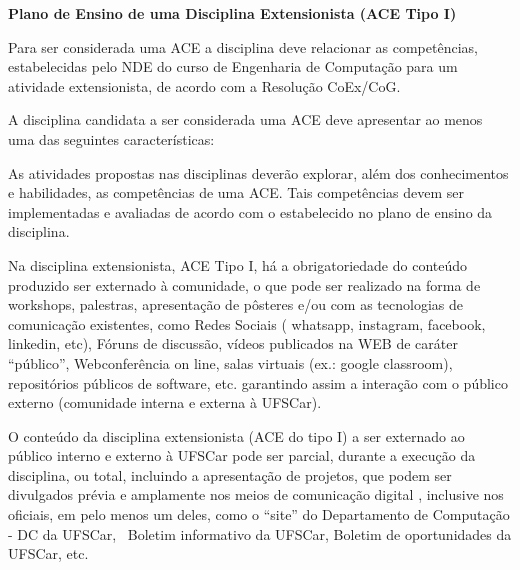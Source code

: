 \bigskip

\textbf{Plano de Ensino de uma Disciplina Extensionista (ACE Tipo I)}


\bigskip

Para ser considerada uma ACE a disciplina deve relacionar as competências, estabelecidas pelo NDE do curso de Engenharia
de Computação para um atividade extensionista, de acordo com a Resolução CoEx/CoG. 

A disciplina candidata a ser considerada uma ACE deve apresentar ao menos uma das seguintes características: 


\bigskip

As atividades propostas nas disciplinas deverão explorar, além dos conhecimentos e habilidades, as competências de uma
ACE. Tais competências devem ser implementadas e avaliadas de acordo com o estabelecido no plano de ensino da
disciplina.


\bigskip

Na disciplina extensionista, ACE Tipo I, há a obrigatoriedade do conteúdo produzido ser externado à comunidade, o que
pode ser realizado na forma de workshops, palestras, apresentação de pôsteres e/ou com as tecnologias de comunicação
existentes, como Redes Sociais (%
whatsapp, instagram, facebook, linkedin, etc), Fóruns de discussão, vídeos publicados na WEB de caráter “público”,
Webconferência on line, salas virtuais (ex.: google classroom), repositórios públicos de software, etc. garantindo
assim a interação com o público externo (comunidade interna e externa à UFSCar).


\bigskip

O conteúdo da disciplina extensionista (ACE do tipo I) a ser externado ao público interno e externo à UFSCar pode ser
parcial, durante a execução da disciplina, ou total, incluindo a apresentação de projetos, que podem ser divulgados
prévia e amplamente nos meios de comunicação digital%
, inclusive nos oficiais, em pelo menos um deles, como o “site” do Departamento de Computação - DC da UFSCar, \ Boletim
informativo da UFSCar, Boletim de oportunidades da UFSCar, etc.

%